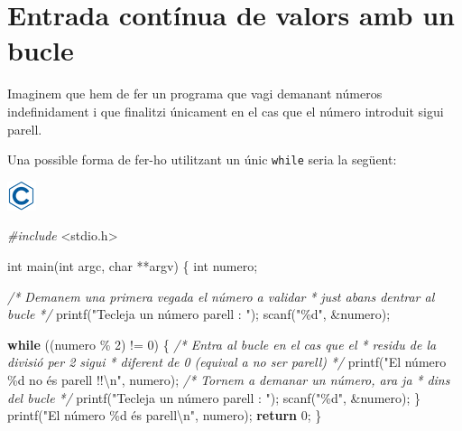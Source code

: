 \documentclass[
]{book}
\newenvironment{Shaded}{\begin{snugshade}}{\end{snugshade}}
\newcommand{\CommentTok}[1]{\textcolor[rgb]{0.56,0.35,0.01}{\textit{#1}}}
\newcommand{\ControlFlowTok}[1]{\textcolor[rgb]{0.13,0.29,0.53}{\textbf{#1}}}
\newcommand{\DataTypeTok}[1]{\textcolor[rgb]{0.13,0.29,0.53}{#1}}
\newcommand{\DecValTok}[1]{\textcolor[rgb]{0.00,0.00,0.81}{#1}}
\newcommand{\ImportTok}[1]{#1}
\newcommand{\NormalTok}[1]{#1}
\newcommand{\PreprocessorTok}[1]{\textcolor[rgb]{0.56,0.35,0.01}{\textit{#1}}}
\newcommand{\SpecialCharTok}[1]{\textcolor[rgb]{0.00,0.00,0.00}{#1}}
\newcommand{\StringTok}[1]{\textcolor[rgb]{0.31,0.60,0.02}{#1}}
\begin{document}
\hypertarget{entrada-contuxednua-de-valors-amb-un-bucle}{%
\section{Entrada contínua de valors amb un bucle}\label{entrada-contuxednua-de-valors-amb-un-bucle}}

Imaginem que hem de fer un programa que vagi demanant números indefinidament i que finalitzi únicament en el cas que el número introduit sigui parell.

Una possible forma de fer-ho utilitzant un únic \texttt{while} seria la següent:

\includegraphics{./img/c.png}

\begin{Shaded}
\begin{Highlighting}[]
\PreprocessorTok{\#include }\ImportTok{\textless{}stdio.h\textgreater{}}

\DataTypeTok{int}\NormalTok{ main(}\DataTypeTok{int}\NormalTok{ argc, }\DataTypeTok{char}\NormalTok{ **argv) \{}
    \DataTypeTok{int}\NormalTok{ numero;}

    \CommentTok{/* Demanem una primera vegada el número a validar}
\CommentTok{     * just abans d\textquotesingle{}entrar al bucle }
\CommentTok{     */}
\NormalTok{    printf(}\StringTok{"Tecleja un número parell : "}\NormalTok{);}
\NormalTok{    scanf(}\StringTok{"\%d"}\NormalTok{, \&numero);}

    \ControlFlowTok{while}\NormalTok{ ((numero \% }\DecValTok{2}\NormalTok{) != }\DecValTok{0}\NormalTok{) \{}
        \CommentTok{/* Entra al bucle en el cas que el}
\CommentTok{         * residu de la divisió per 2 sigui }
\CommentTok{         * diferent de 0 (equival a no ser parell) }
\CommentTok{         */}
\NormalTok{        printf(}\StringTok{"El número \%d no és parell !!}\SpecialCharTok{\textbackslash{}n}\StringTok{"}\NormalTok{, numero);}
        \CommentTok{/* Tornem a demanar un número, ara ja}
\CommentTok{         * dins del bucle }
\CommentTok{         */}
\NormalTok{        printf(}\StringTok{"Tecleja un número parell : "}\NormalTok{);}
\NormalTok{        scanf(}\StringTok{"\%d"}\NormalTok{, \&numero);}
\NormalTok{    \}}
\NormalTok{    printf(}\StringTok{"El número \%d és parell}\SpecialCharTok{\textbackslash{}n}\StringTok{"}\NormalTok{, numero);}
    \ControlFlowTok{return} \DecValTok{0}\NormalTok{;}
\NormalTok{\}}
\end{Highlighting}
\end{Shaded}
\end{document}
